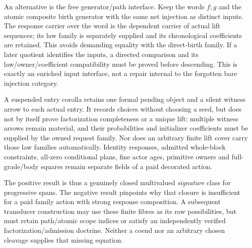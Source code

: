 \documentclass[11pt]{article}
\begin{document}
An alternative is the free generator/path interface. Keep the words $f;g$ and the atomic composite birth generator with the same net injection as distinct inputs. The response carrier over the word is the dependent carrier of actual lift sequences; its law family is separately supplied and its chronological coefficients are retained. This avoids demanding equality with the direct-birth family. If a later quotient identifies the inputs, a directed comparison and its law/owner/coefficient compatibility must be proved before descending. This is exactly an enriched input interface, not a repair internal to the forgotten bare injection category.

A suspended entry corolla retains one formal pending object and a silent witness arrow to each actual entry. It records choices without choosing a seed, but does not by itself prove factorization completeness or a unique lift: multiple witness arrows remain material, and their probabilities and initializer coefficients must be supplied by the owned request family. Nor does an arbitrary finite lift cover carry those law families automatically. Identity responses, admitted whole-block constraints, all-zero conditional plans, fine actor ages, primitive owners and full-grade/body squares remain separate fields of a paid decorated action.

The positive result is thus a genuinely closed multivalued \emph{signature} class for progressive spans. The negative result pinpoints why that closure is insufficient for a paid family action with strong response composition. A subsequent transducer construction may use these finite fibres as its raw possibilities, but must retain path/atomic scope indices or satisfy an independently verified factorization/admission doctrine. Neither a coend nor an arbitrary chosen cleavage supplies that missing equation.
\end{document}
